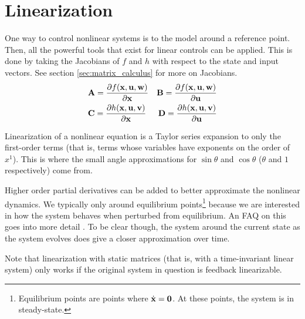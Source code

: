 \section{Linearization}

One way to control nonlinear \glspl{system} is to
 the \gls{model} around a reference point.
Then, all the powerful tools that exist for linear controls can be applied. This
is done by taking the Jacobians of $f$ and $h$ with respect to the state and
input vectors. See section \ref{sec:matrix_calculus} for more on Jacobians.
\begin{align*}
  &\mathbf{A} = \frac{\partial f(\mathbf{x}, \mathbf{u}, \mathbf{w})}{\partial \mathbf{x}}
  &\mathbf{B} = \frac{\partial f(\mathbf{x}, \mathbf{u}, \mathbf{w})}{\partial \mathbf{u}} \\
  &\mathbf{C} = \frac{\partial h(\mathbf{x}, \mathbf{u}, \mathbf{v})}{\partial \mathbf{x}}
  &\mathbf{D} = \frac{\partial h(\mathbf{x}, \mathbf{u}, \mathbf{v})}{\partial \mathbf{u}}
\end{align*}

Linearization of a nonlinear equation is a Taylor series expansion to only the
first-order terms (that is, terms whose variables have exponents on the order of
$x^1$). This is where the small angle approximations for $\sin\theta$ and
$\cos\theta$ ($\theta$ and $1$ respectively) come from.

Higher order partial derivatives can be added to better approximate the
nonlinear dynamics. We typically only  around
equilibrium points\footnote{Equilibrium points are points where
$\dot{\mathbf{x}} = \mathbf{0}$. At these points, the system is in steady-state.}
because we are interested in how the \gls{system} behaves when perturbed from
equilibrium. An FAQ on this goes into more detail
\cite{bib:linearize_equilibrium_point}. To be clear though,
 the \gls{system} around the current
\gls{state} as the \gls{system} evolves does give a closer approximation over
time.

Note that linearization with static matrices (that is, with a time-invariant
linear \gls{system}) only works if the original \gls{system} in question is
feedback linearizable.
